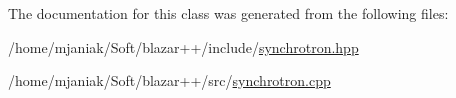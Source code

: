 The documentation for this class was generated from the following files\-:\begin{DoxyCompactItemize}
\item 
/home/mjaniak/\-Soft/blazar++/include/\hyperlink{synchrotron_8hpp}{synchrotron.\-hpp}\item 
/home/mjaniak/\-Soft/blazar++/src/\hyperlink{synchrotron_8cpp}{synchrotron.\-cpp}\end{DoxyCompactItemize}
